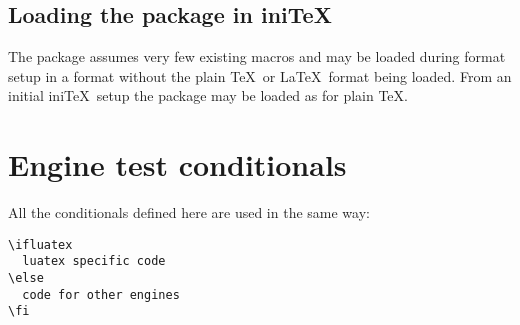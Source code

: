 \documentclass{article}
\begin{document}
\subsection{Loading the package in ini\TeX}
The package assumes very few existing macros and may be loaded
during format setup in a format without the plain \TeX\ or \LaTeX\
format being loaded. From an initial ini\TeX\ setup the package may
be loaded as for plain \TeX.

\section{Engine test conditionals}
All the conditionals defined here are used in the same way:
\begin{verbatim}
\ifluatex
  luatex specific code
\else
  code for other engines
\fi
\end{verbatim}
\end{document}
